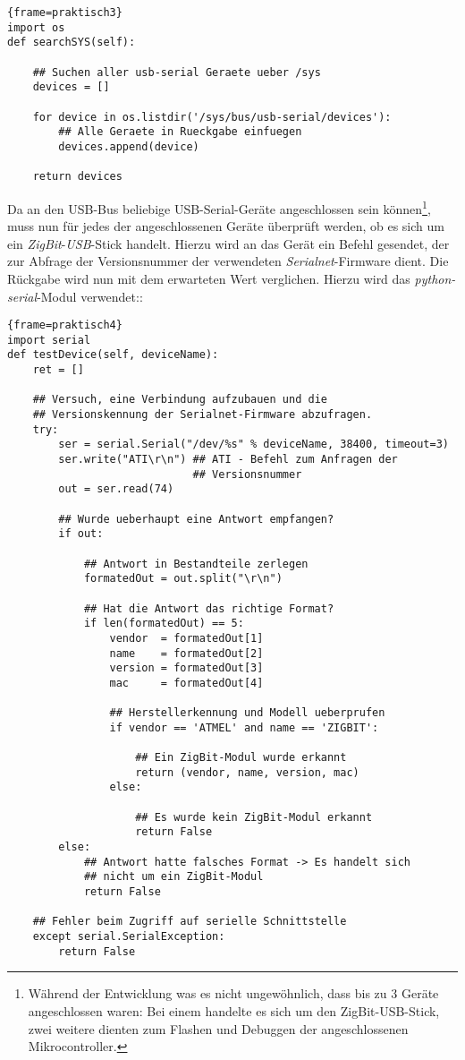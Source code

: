 \begin{lstlisting}{frame=praktisch3}
import os
def searchSYS(self):

    ## Suchen aller usb-serial Geraete ueber /sys 
    devices = []

    for device in os.listdir('/sys/bus/usb-serial/devices'):
        ## Alle Geraete in Rueckgabe einfuegen
        devices.append(device)

    return devices
\end{lstlisting}

Da an den USB-Bus beliebige USB-Serial-Geräte angeschlossen sein können\footnote{Während der Entwicklung
was es nicht ungewöhnlich, dass bis zu 3 Geräte angeschlossen waren: Bei einem handelte es sich um den
ZigBit-USB-Stick, zwei weitere dienten zum Flashen und Debuggen der angeschlossenen Mikrocontroller.}, 
muss nun für jedes der angeschlossenen Geräte überprüft werden, ob es sich um ein \emph{ZigBit}-\emph{USB}-Stick
handelt. Hierzu wird an das Gerät ein Befehl gesendet, der zur Abfrage der Versionsnummer der verwendeten
\emph{Serialnet}-Firmware dient. Die Rückgabe wird nun mit dem erwarteten Wert verglichen. Hierzu wird das
\emph{python-serial}-Modul verwendet::

\begin{lstlisting}{frame=praktisch4}
import serial
def testDevice(self, deviceName):
    ret = []

    ## Versuch, eine Verbindung aufzubauen und die 
    ## Versionskennung der Serialnet-Firmware abzufragen. 
    try:
        ser = serial.Serial("/dev/%s" % deviceName, 38400, timeout=3)
        ser.write("ATI\r\n") ## ATI - Befehl zum Anfragen der
                             ## Versionsnummer
        out = ser.read(74)
        
        ## Wurde ueberhaupt eine Antwort empfangen? 
        if out:

            ## Antwort in Bestandteile zerlegen
            formatedOut = out.split("\r\n")

            ## Hat die Antwort das richtige Format?
            if len(formatedOut) == 5:
                vendor  = formatedOut[1]
                name    = formatedOut[2]
                version = formatedOut[3]
                mac     = formatedOut[4]

                ## Herstellerkennung und Modell ueberprufen
                if vendor == 'ATMEL' and name == 'ZIGBIT':

                    ## Ein ZigBit-Modul wurde erkannt
                    return (vendor, name, version, mac)
                else:

                    ## Es wurde kein ZigBit-Modul erkannt
                    return False
        else:
            ## Antwort hatte falsches Format -> Es handelt sich
            ## nicht um ein ZigBit-Modul
            return False

    ## Fehler beim Zugriff auf serielle Schnittstelle
    except serial.SerialException:
        return False
\end{lstlisting}

